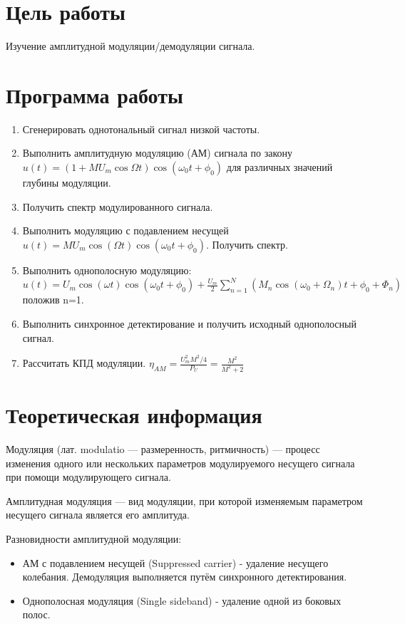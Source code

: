 
\usepackage{minted}




\setcounter{page}{2}



\section{Цель работы}
Изучение амплитудной модуляции/демодуляции сигнала.

\section{Программа работы}
\begin{enumerate}
	\item Сгенерировать однотональный сигнал низкой частоты.
	\item Выполнить амплитудную модуляцию (АМ) сигнала по закону
	$ u(t) = (1 + MU_m\cos\Omega t)\cos(\omega_0 t + \phi_0) $
	для различных значений глубины модуляции.
	\item Получить спектр модулированного сигнала.
	\item Выполнить модуляцию с подавлением несущей
	$ u(t) = MU_m\cos(\Omega t)\cos(\omega_0 t + \phi_0). $
	Получить спектр.
	\item Выполнить однополосную модуляцию:
	$ u(t) = U_m\cos(\omega t)\cos(\omega_0 t + \phi_0) + \frac{U_m}{2}\sum_{n=1}^{N}(M_n\cos(\omega_0 + \Omega_n) t + \phi_0 + \Phi_n)$ положив n=1.
	\item Выполнить синхронное детектирование и получить исходный
	однополосный сигнал.
	\item Рассчитать КПД модуляции.
	$ \eta_{AM} = \frac{U_m^2 M^2 / 4}{P_U} = \frac{M^2}{M^2 + 2}$
\end{enumerate}

\section{Теоретическая информация}
Модуляция (лат. modulatio — размеренность, ритмичность) — процесс изменения одного или нескольких параметров модулируемого несущего сигнала при помощи модулирующего сигнала.

Амплитудная модуляция — вид модуляции, при которой изменяемым параметром несущего сигнала является его амплитуда.

Разновидности амплитудной модуляции:
\begin{itemize}
	\item АМ с подавлением несущей (Suppressed carrier) - удаление несущего колебания.
	Демодуляция выполняется путём синхронного детектирования.
	\item Однополосная модуляция (Single sideband) - удаление одной из боковых полос.
\end{itemize}

